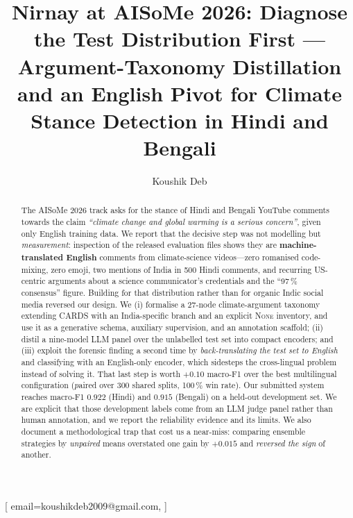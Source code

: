 \documentclass[twocolumn]{ceurart}
\begin{document}


\title{Nirnay at AISoMe 2026: Diagnose the Test Distribution First ---
  Argument-Taxonomy Distillation and an English Pivot for Climate Stance
  Detection in Hindi and Bengali}

\author[1,2]{Koushik Deb}[
  email=koushikdeb2009@gmail.com,
]
\address[1]{Indian Institute of Information Technology Kalyani,
  Kalyani, West Bengal, India}
\address[2]{Accenture, Kolkata, West Bengal, India}

\begin{abstract}
  The AISoMe 2026 track asks for the stance of Hindi and Bengali YouTube
  comments towards the claim \emph{``climate change and global warming is a
  serious concern''}, given only English training data. We report that the
  decisive step was not modelling but \emph{measurement}: inspection of the
  released evaluation files shows they are \textbf{machine-translated English}
  comments from climate-science videos---zero romanised code-mixing, zero
  emoji, two mentions of India in 500 Hindi comments, and recurring
  US-centric arguments about a science communicator's credentials and the
  ``97\,\% consensus'' figure. Building for that distribution rather than for
  organic Indic social media reversed our design. We (i) formalise a 27-node
  climate-argument taxonomy extending CARDS with an India-specific branch and
  an explicit \textsc{None} inventory, and use it as a generative schema,
  auxiliary supervision, and an annotation scaffold; (ii) distil a nine-model
  LLM panel over the unlabelled test set into compact encoders; and
  (iii) exploit the forensic finding a second time by \emph{back-translating
  the test set to English} and classifying with an English-only encoder,
  which sidesteps the cross-lingual problem instead of solving it. That last
  step is worth $+0.10$ macro-F1 over the best multilingual configuration
  ($p$aired over 300 shared splits, 100\,\% win rate). Our submitted system
  reaches macro-F1 $0.922$ (Hindi) and $0.915$ (Bengali) on a held-out
  development set. We are explicit that those development labels come from an
  LLM judge panel rather than human annotation, and we report the reliability
  evidence and its limits. We also document a methodological trap that cost us
  a near-miss: comparing ensemble strategies by \emph{unpaired} means
  overstated one gain by $+0.015$ and \emph{reversed the sign} of another.
\end{abstract}
\end{document}
